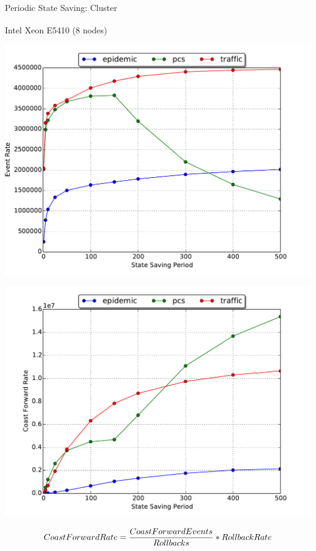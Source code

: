\documentclass[10pt]{beamer}
\begin{document}
\begin{frame}{Periodic State Saving: Cluster}
    \begin{block}{Intel\textsuperscript{\textregistered} Xeon\textsuperscript{\textregistered} E5410 (8 nodes)}
        \smallskip
        \begin{minipage}{0.55\textwidth}
            \includegraphics[width=\textwidth]{../figs/state_saving/beowulf/eventrate_500.pdf}
        \end{minipage}%
        \begin{minipage}{0.55\textwidth}
            \includegraphics[width=\textwidth]{../figs/state_saving/beowulf/cf_rate_500.pdf}
        \end{minipage}
    $$ CoastForwardRate = {CoastForwardEvents \over Rollbacks} * RollbackRate $$
    \end{block}
\end{frame}
\end{document}
